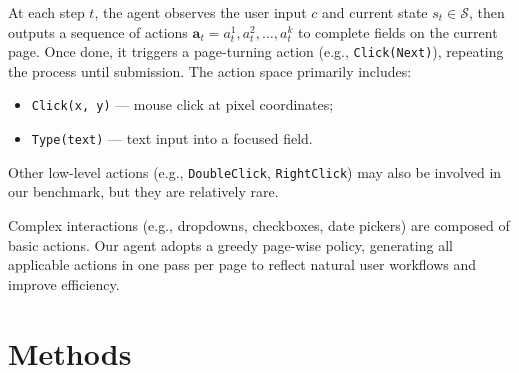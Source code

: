 \documentclass[sigconf, screen, review]{acmart}
\begin{document}
At each step $t$, the agent observes the user input $c$ and current state $s_t \in \mathcal{S}$, then outputs a sequence of actions $\mathbf{a}_t = {a_t^1, a_t^2, \dots, a_t^k}$ to complete fields on the current page. Once done, it triggers a page-turning action (e.g., \texttt{Click(Next)}), repeating the process until submission.
The action space primarily includes:
\begin{itemize}
\item \texttt{Click(x, y)} — mouse click at pixel coordinates;
\item \texttt{Type(text)} — text input into a focused field.
\end{itemize}
Other low-level actions (e.g., \texttt{DoubleClick}, \texttt{RightClick}) may also be involved in our benchmark, but they are relatively rare.

Complex interactions (e.g., dropdowns, checkboxes, date pickers) are composed of basic actions. Our agent adopts a greedy page-wise policy, generating all applicable actions in one pass per page to reflect natural user workflows and improve efficiency.

\section{Methods}
\end{document}
